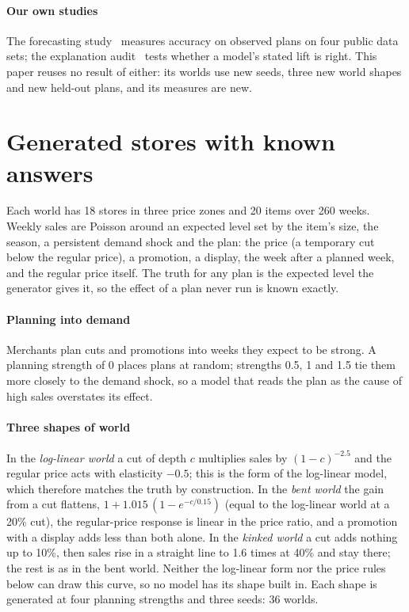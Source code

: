 \paragraph{Our own studies} The forecasting study~\cite{rwm} measures accuracy on observed plans on four public data
sets; the explanation audit~\cite{paper2} tests whether a model's stated lift is right. This paper reuses no result
of either: its worlds use new seeds, three new world shapes and new held-out plans, and its measures are new.

\section{Generated stores with known answers}\label{sec:data}

Each world has 18 stores in three price zones and 20 items over 260 weeks. Weekly sales are Poisson around an
expected level set by the item's size, the season, a persistent demand shock and the plan: the price (a temporary
cut below the regular price), a promotion, a display, the week after a planned week, and the regular price itself.
The truth for any plan is the expected level the generator gives it, so the effect of a plan never run is known
exactly.

\paragraph{Planning into demand} Merchants plan cuts and promotions into weeks they expect to be strong. A
planning strength of 0 places plans at random; strengths 0.5, 1 and 1.5 tie them more closely to the demand shock,
so a model that reads the plan as the cause of high sales overstates its effect.

\paragraph{Three shapes of world} In the \emph{log-linear world} a cut of depth $c$ multiplies sales by
$(1-c)^{-2.5}$ and the regular price acts with elasticity $-0.5$; this is the form of the log-linear model, which
therefore matches the truth by construction. In the \emph{bent world} the gain from a cut flattens,
$1 + 1.015\,(1 - e^{-c/0.15})$ (equal to the log-linear world at a 20\% cut), the regular-price response is linear
in the price ratio, and a promotion with a display adds less than both alone. In the \emph{kinked world} a cut adds
nothing up to 10\%, then sales rise in a straight line to 1.6 times at 40\% and stay there; the rest is as in the bent
world. Neither the log-linear form nor the price rules below can draw this curve, so no model has its shape built in.
Each shape is generated at four planning strengths and three seeds: 36 worlds.

